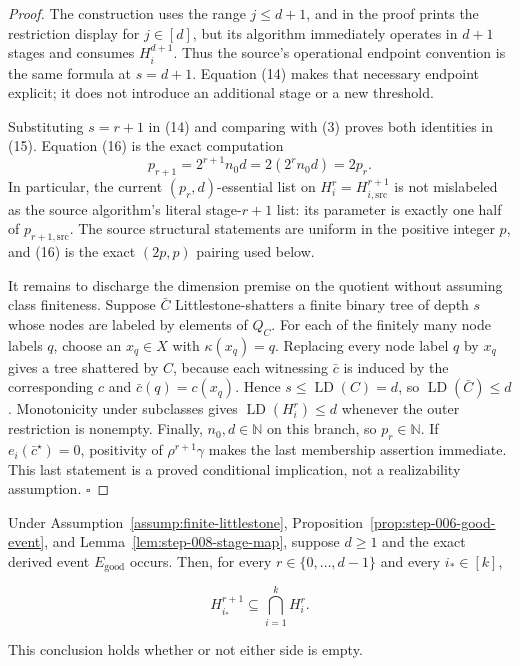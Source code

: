 \begin{proof}
The construction uses the range \(j\le d+1\), and in
the proof prints the restriction display for \(j\in[d]\), but its
algorithm immediately operates in \(d+1\) stages and consumes
\(H_i^{d+1}\). Thus the source's operational endpoint convention is the
same formula at \(s=d+1\). Equation (14) makes that necessary endpoint
explicit; it does not introduce an additional stage or a new threshold.

Substituting \(s=r+1\) in (14) and comparing with (3) proves both identities
in (15). Equation (16) is the exact computation
\[
 p_{r+1}=2^{r+1}n_0d=2(2^rn_0d)=2p_r.
\]
In particular, the current \((p_r,d)\)-essential list on
\(H_i^r=H_{i,\mathrm{src}}^{r+1}\) is not mislabeled as the source
algorithm's literal stage-\(r+1\) list: its parameter is exactly one half
of \(p_{r+1,\mathrm{src}}\). The source structural statements are uniform
in the positive integer \(p\), and (16) is the exact \((2p,p)\) pairing
used below.

It remains to discharge the dimension premise on the quotient without
assuming class finiteness. Suppose \(\bar C\) Littlestone-shatters a finite
binary tree of depth \(s\) whose nodes are labeled by elements of \(Q_C\).
For each of the finitely many node labels \(q\), choose an
\(x_q\in X\) with \(\kappa(x_q)=q\). Replacing every node label \(q\) by
\(x_q\) gives a tree shattered by \(C\), because each witnessing
\(\bar c\) is induced by the corresponding \(c\) and
\(\bar c(q)=c(x_q)\). Hence \(s\le\operatorname{LD}(C)=d\), so
\(\operatorname{LD}(\bar C)\le d\). Monotonicity under subclasses gives
\(\operatorname{LD}(H_i^r)\le d\) whenever the outer restriction is
nonempty. Finally, \(n_0,d\in\mathbb N\) on this branch, so \(p_r\in
\mathbb N\). If \(e_i(\bar c^\star)=0\), positivity of
\(\rho^{r+1}\gamma\) makes the last membership assertion immediate. This
last statement is a proved conditional implication, not a realizability
assumption. \(\square\)


\end{proof}

\begin{proposition}\label{prop:step-008-inclusion}
Under Assumption~\ref{assump:finite-littlestone}, Proposition~\ref{prop:step-006-good-event}, and
Lemma~\ref{lem:step-008-stage-map}, suppose \(d\ge1\) and the exact derived
event \(E_{\mathrm{good}}\) occurs. Then, for every
\(r\in\{0,\ldots,d-1\}\) and every \(i_*\in[k]\),

\[
 H_{i_*}^{r+1}\subseteq\bigcap_{i=1}^k H_i^r.
\tag{17}
\]

This conclusion holds whether or not either side is empty.


\end{proposition}


